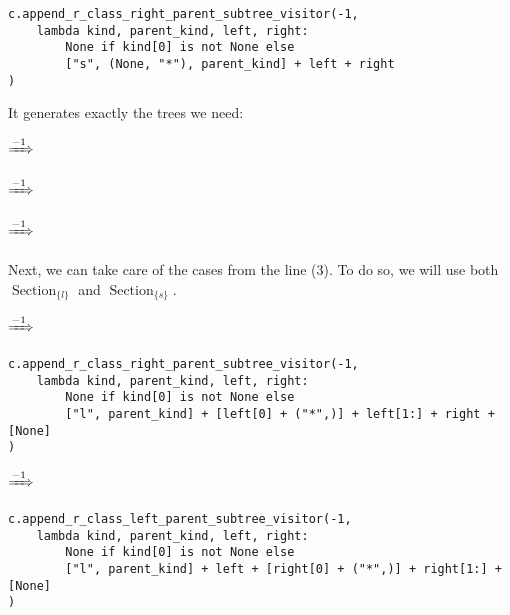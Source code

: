 \documentclass[final]{article}
\theoremstyle{definition}
\theoremstyle{definition}
\theoremstyle{remark}
\DeclareMathOperator{\tSection}{\text{Section}}
\newcommand{\includeinlinescaledsvg}[3]{\begin{minipage}{#1\textwidth}\begin{center}\end{center}\end{minipage}}
\begin{document}
\begin{lstlisting}
c.append_r_class_right_parent_subtree_visitor(-1,
    lambda kind, parent_kind, left, right:
        None if kind[0] is not None else
        ["s", (None, "*"), parent_kind] + left + right
)
\end{lstlisting}

It generates exactly the trees we need:

\begin{center}
    \includeinlinescaledsvg{.24}{.4}{lambda__trees_110__0_base}%
    \(\xRightarrow{-1}\)%
    \includeinlinescaledsvg{.24}{.4}{lambda__trees_110__0}%

    \includeinlinescaledsvg{.24}{.4}{lambda__trees_110__1_base}%
    \(\xRightarrow{-1}\)%
    \includeinlinescaledsvg{.24}{.4}{lambda__trees_110__1}%
    \includeinlinescaledsvg{.24}{.4}{lambda__trees_110__2_base}%
    \(\xRightarrow{-1}\)%
    \includeinlinescaledsvg{.24}{.4}{lambda__trees_110__2}%
\end{center}

Next, we can take care of the cases from the line (3). To do so, we will use both \(\tSection_{\{l\}}\) and \(\tSection_{\{s\}}\).

\begin{center}
    \includeinlinescaledsvg{.4}{.7}{lambda__transformations__004a}%
    \(\xRightarrow{-1}\)%
    \includeinlinescaledsvg{.4}{.7}{lambda__transformations__004b}%
\end{center}

\begin{lstlisting}
c.append_r_class_right_parent_subtree_visitor(-1,
    lambda kind, parent_kind, left, right:
        None if kind[0] is not None else
        ["l", parent_kind] + [left[0] + ("*",)] + left[1:] + right + [None]
)
\end{lstlisting}

\begin{center}
    \includeinlinescaledsvg{.4}{.7}{lambda__transformations__005a}%
    \(\xRightarrow{-1}\)%
    \includeinlinescaledsvg{.4}{.7}{lambda__transformations__005b}%
\end{center}

\begin{lstlisting}
c.append_r_class_left_parent_subtree_visitor(-1,
    lambda kind, parent_kind, left, right:
        None if kind[0] is not None else
        ["l", parent_kind] + left + [right[0] + ("*",)] + right[1:] + [None]
)
\end{lstlisting}
\end{document}
